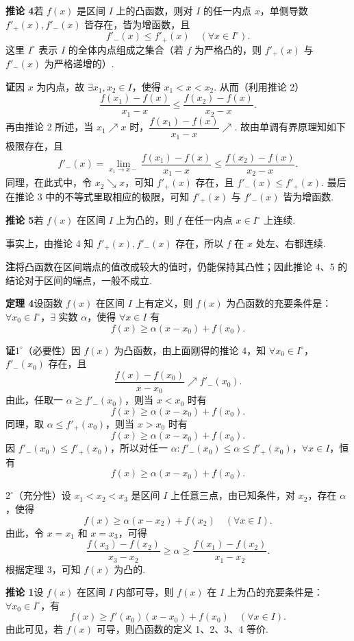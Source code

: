 \documentclass[UTF8, 12pt, fontset=fandol, oneside]{ctexart}
\begin{document}
\noindent\textbf{推论 4}\quad 若 $f(x)$ 是区间 $I$ 上的凸函数，则对 $I$ 的任一内点 $x$，单侧导数 $f'_+(x),f'_-(x)$ 皆存在，皆为增函数，且
\[
  f'_-(x)\le f'_+(x)\quad(\forall x\in I^\circ).
\]
这里 $I^\circ$ 表示 $I$ 的全体内点组成之集合（若 $f$ 为严格凸的，则 $f'_+(x)$ 与 $f'_-(x)$ 为严格递增的）.

\noindent\textbf{证}\quad 因 $x$ 为内点，故 $\exists x_1,x_2\in I$，使得 $x_1<x<x_2$. 从而（利用推论 2）
\[
  \frac{f(x_1)-f(x)}{x_1-x}
  \le\frac{f(x_2)-f(x)}{x_2-x}.
\]
再由推论 2 所述，当 $x_1\nearrow x$ 时，$\dfrac{f(x_1)-f(x)}{x_1-x}\nearrow$. 故由单调有界原理知如下极限存在，且
\[
  f'_-(x)=\lim_{x_1\to x-}\frac{f(x_1)-f(x)}{x_1-x}
  \le\frac{f(x_2)-f(x)}{x_2-x}.
\]
同理，在此式中，令 $x_2\searrow x$，可知 $f'_+(x)$ 存在，且 $f'_-(x)\le f'_+(x)$. 最后在推论 3 中的不等式里取相应的极限，可知 $f'_+(x)$ 与 $f'_-(x)$ 皆为增函数.

\noindent\textbf{推论 5}\quad 若 $f(x)$ 在区间 $I$ 上为凸的，则 $f$ 在任一内点 $x\in I^\circ$ 上连续.

事实上，由推论 4 知 $f'_+(x),f'_-(x)$ 存在，所以 $f$ 在 $x$ 处左、右都连续.

\noindent\textbf{注}\quad 将凸函数在区间端点的值改成较大的值时，仍能保持其凸性；因此推论 4、5 的结论对于区间的端点，一般不成立.

\noindent\textbf{定理 4}\quad 设函数 $f(x)$ 在区间 $I$ 上有定义，则 $f(x)$ 为凸函数的充要条件是：$\forall x_0\in I^\circ$，$\exists$ 实数 $\alpha$，使得 $\forall x\in I$ 有
\[
  f(x)\ge \alpha(x-x_0)+f(x_0).
\]

\noindent\textbf{证}\quad $1^\circ$（必要性）因 $f(x)$ 为凸函数，由上面刚得的推论 4，知 $\forall x_0\in I^\circ$，$f'_-(x_0)$ 存在，且
\[
  \frac{f(x)-f(x_0)}{x-x_0}\nearrow f'_-(x_0).
\]
由此，任取一 $\alpha\ge f'_-(x_0)$，则当 $x<x_0$ 时有
\[
  f(x)\ge \alpha(x-x_0)+f(x_0).
\]
同理，取 $\alpha\le f'_+(x_0)$，则当 $x>x_0$ 时有
\[
  f(x)\ge \alpha(x-x_0)+f(x_0).
\]
因 $f'_-(x_0)\le f'_+(x_0)$，所以对任一 $\alpha:f'_-(x_0)\le\alpha\le f'_+(x_0)$，$\forall x\in I$，恒有
\[
  f(x)\ge \alpha(x-x_0)+f(x_0).
\]

$2^\circ$（充分性）设 $x_1<x_2<x_3$ 是区间 $I$ 上任意三点，由已知条件，对 $x_2$，存在 $\alpha$，使得
\[
  f(x)\ge \alpha(x-x_2)+f(x_2)\quad(\forall x\in I).
\]
由此，令 $x=x_1$ 和 $x=x_3$，可得
\[
  \frac{f(x_3)-f(x_2)}{x_3-x_2}\ge \alpha\ge \frac{f(x_1)-f(x_2)}{x_1-x_2}.
\]
根据定理 3，可知 $f(x)$ 为凸的.

\noindent\textbf{推论 1}\quad 设 $f(x)$ 在区间 $I$ 内部可导，则 $f(x)$ 在 $I$ 上为凸的充要条件是：$\forall x_0\in I^\circ$，有
\[
  f(x)\ge f'(x_0)(x-x_0)+f(x_0)\quad(\forall x\in I).
\]
由此可见，若 $f(x)$ 可导，则凸函数的定义 1、2、3、4 等价.
\end{document}
